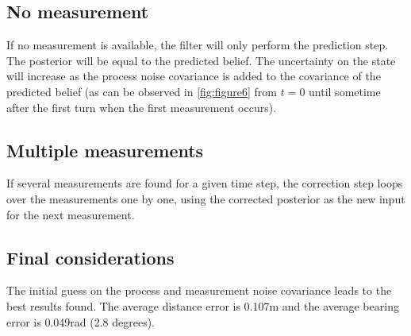 \documentclass{article}
\begin{document}
\subsection{No measurement}
If no measurement is available, the filter will only perform the prediction step. The posterior will be equal to the predicted belief. The uncertainty on the state will increase as the process noise covariance is added to the covariance of the predicted belief (as can be observed in \autoref{fig:figure6} from $t=0$ until sometime after the first turn when the first measurement occurs).

\subsection{Multiple measurements}
If several measurements are found for a given time step, the correction step loops over the measurements one by one, using the corrected posterior as the new input for the next measurement.

\subsection{Final considerations}

The initial guess on the process and measurement noise covariance leads to the best results found. 
The average distance error is 0.107m and the average bearing error is 0.049rad (2.8 degrees).
\end{document}
